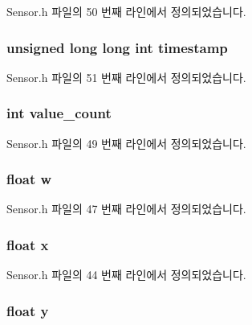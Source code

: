 Sensor.\-h 파일의 50 번째 라인에서 정의되었습니다.

\hypertarget{struct__4d__data_a8de02c4128636a7bf630ff5428f60c8d}{
\subsubsection[{timestamp}]{\setlength{\rightskip}{0pt plus 5cm}unsigned long long int timestamp}}\label{struct__4d__data_a8de02c4128636a7bf630ff5428f60c8d}


Sensor.\-h 파일의 51 번째 라인에서 정의되었습니다.

\hypertarget{struct__4d__data_a40a079bfc72408819dc78da308203a74}{
\subsubsection[{value\-\_\-count}]{\setlength{\rightskip}{0pt plus 5cm}int value\-\_\-count}}\label{struct__4d__data_a40a079bfc72408819dc78da308203a74}


Sensor.\-h 파일의 49 번째 라인에서 정의되었습니다.

\hypertarget{struct__4d__data_a56eca241e2896b9f57a79589e76fd24b}{
\subsubsection[{w}]{\setlength{\rightskip}{0pt plus 5cm}float w}}\label{struct__4d__data_a56eca241e2896b9f57a79589e76fd24b}


Sensor.\-h 파일의 47 번째 라인에서 정의되었습니다.

\hypertarget{struct__4d__data_ad0da36b2558901e21e7a30f6c227a45e}{
\subsubsection[{x}]{\setlength{\rightskip}{0pt plus 5cm}float x}}\label{struct__4d__data_ad0da36b2558901e21e7a30f6c227a45e}


Sensor.\-h 파일의 44 번째 라인에서 정의되었습니다.

\hypertarget{struct__4d__data_aa4f0d3eebc3c443f9be81bf48561a217}{
\subsubsection[{y}]{\setlength{\rightskip}{0pt plus 5cm}float y}}\label{struct__4d__data_aa4f0d3eebc3c443f9be81bf48561a217}


